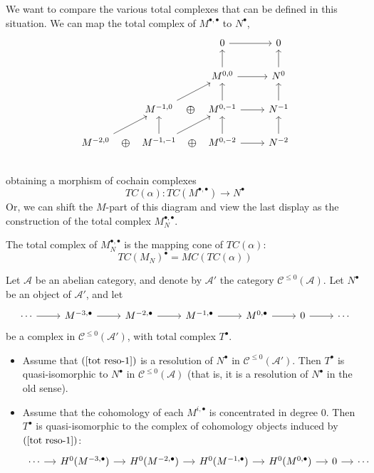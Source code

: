 We want to compare the various total complexes that can be defined in this
situation. We can map the total complex of $M^{\bullet,\bullet}$ to $N^\bullet$,
\[\begin{tikzcd}
{}&{}&0\ar[r]&0\\
{}&{}&M^{0,0}\ar[u]\ar[r]&N^0\ar[u]\\
{}&M^{-1,0}\ar[draw=none]{r}[name=X, anchor=center,scale=1.5]{\oplus}\ar[ru]&M^{0,-1}\ar[r]\ar[u]&N^{-1}\ar[u]\\
M^{-2,0}\ar[draw=none]{r}[name=X, anchor=center,scale=1.5]{\oplus}\ar[ru]&M^{-1,-1}\ar[draw=none]{r}[name=X, anchor=center,scale=1.5]{\oplus}\ar[u]\ar[ru]&M^{0,-2}\ar[u]\ar[r]&N^{-2}\ar[u]\\
\end{tikzcd}\]
obtaining a morphism of cochain complexes
\[TC(\alpha):TC(M^{\bullet,\bullet})\to N^\bullet\]
Or, we can shift the $M$-part of this diagram and view the last display as the construction of the total complex $M_N^{\bullet,\bullet}$.
\begin{claim}\label{tot map cone}
The total complex of $M^{\bullet,\bullet}_N$ is the mapping cone of $TC(\alpha)$:
\[TC(M_N)^\bullet=MC(TC(\alpha))\]
\end{claim}
\begin{theorem}\label{tot reso}
Let $\mathcal{A}$ be an abelian category, and denote by $\mathcal{A}'$ the category $\mathcal{C}^{\leq0}(\mathcal{A})$. Let $N^\bullet$ be an object of $\mathcal{A}'$, and let
\begin{equation}\label{tot reso-1}
\begin{tikzcd}
\cdots\ar[r]&M^{-3,\bullet}\ar[r]&M^{-2,\bullet}\ar[r]&M^{-1,\bullet}\ar[r]&M^{0,\bullet}\ar[r]&0\ar[r]&\cdots
\end{tikzcd}
\end{equation}
be a complex in $\mathcal{C}^{\leq0}(\mathcal{A}')$, with total complex $T^\bullet$.
\begin{itemize}
\item Assume that $(\ref{tot reso-1})$ is a resolution of $N^\bullet$ in $\mathcal{C}^{\leq0}(\mathcal{A}')$. Then $T^\bullet$ is quasi-isomorphic
to $N^\bullet$ in $\mathcal{C}^{\leq0}(\mathcal{A})$ (that is, it is a resolution of $N^\bullet$ in the old sense).
\item Assume that the cohomology of each $M^{i,\bullet}$ is concentrated in degree $0$. Then $T^\bullet$ is quasi-isomorphic to the complex of cohomology objects induced by $(\ref{tot reso-1})$:
\[\begin{tikzcd}[column sep=small]
\cdots\ar[r]&H^0(M^{-3,\bullet})\ar[r]&H^0(M^{-2,\bullet})\ar[r]&H^0(M^{-1,\bullet})\ar[r]&H^0(M^{0,\bullet})\ar[r]&0\ar[r]&\cdots
\end{tikzcd}\]
\end{itemize}
\end{theorem}
